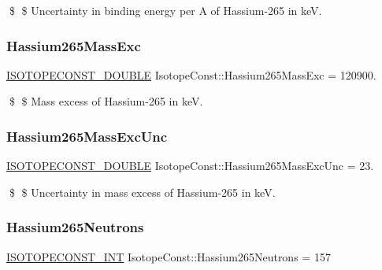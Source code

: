 \$ \$ Uncertainty in binding energy per A of Hassium-\/265 in keV. \mbox{\label{group___isotope_const-_hassium-_hs265_ga33e5d781f7ce0f4559035faa1c2014b3}} 
\subsubsection{\texorpdfstring{Hassium265\+Mass\+Exc}{Hassium265MassExc}}
{\footnotesize\ttfamily \mbox{\hyperlink{group___isotope_const-_macros_ga8f45a7272ce02c0b4c65c44636ed719a}{I\+S\+O\+T\+O\+P\+E\+C\+O\+N\+S\+T\+\_\+\+D\+O\+U\+B\+LE}} Isotope\+Const\+::\+Hassium265\+Mass\+Exc = 120900.}

\$ \$ Mass excess of Hassium-\/265 in keV. \mbox{\label{group___isotope_const-_hassium-_hs265_gaea26652d02a1044612209c38f991e3c6}} 
\subsubsection{\texorpdfstring{Hassium265\+Mass\+Exc\+Unc}{Hassium265MassExcUnc}}
{\footnotesize\ttfamily \mbox{\hyperlink{group___isotope_const-_macros_ga8f45a7272ce02c0b4c65c44636ed719a}{I\+S\+O\+T\+O\+P\+E\+C\+O\+N\+S\+T\+\_\+\+D\+O\+U\+B\+LE}} Isotope\+Const\+::\+Hassium265\+Mass\+Exc\+Unc = 23.}

\$ \$ Uncertainty in mass excess of Hassium-\/265 in keV. \mbox{\label{group___isotope_const-_hassium-_hs265_ga25926d082a68f896b6225cdcfdb81d67}} 
\subsubsection{\texorpdfstring{Hassium265\+Neutrons}{Hassium265Neutrons}}
{\footnotesize\ttfamily \mbox{\hyperlink{group___isotope_const-_macros_ga5f18360b3e99483a35c32d789e62621c}{I\+S\+O\+T\+O\+P\+E\+C\+O\+N\+S\+T\+\_\+\+I\+NT}} Isotope\+Const\+::\+Hassium265\+Neutrons = 157}

